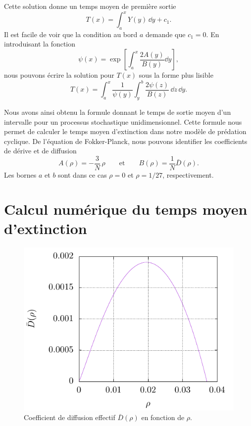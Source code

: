 \documentclass[openany,a4paper,12pt]{article}
\begin{document}
%
Cette solution donne un temps moyen de première sortie
%
\begin{equation}\label{echap_sol_T_avec_c1}
	T(x) = \int_a^x Y(y) \, \dd y + c_1.
\end{equation}
%
Il est facile de voir que la condition au bord $a$ demande que $c_1=0$. En introduisant la fonction   
%
\begin{equation}\label{echap_psi_x}
	\psi(x) = \exp\left[ \int_a^x \frac{2A(y)}{B(y)} \dd y \right] ,
\end{equation}
%
nous pouvons écrire la solution pour $T(x)$ sous la forme plus lisible
%
\begin{equation}\label{echap_sol_T_finale}
	T(x) = \int_a^x \frac{1}{\psi(y)} \int_y^b \frac{2\psi(z)}{B(z)} \, \dd z \, \dd y.
\end{equation}
%

\par Nous avons ainsi obtenu la formule donnant le temps de sortie moyen d'un intervalle pour un processus stochastique unidimensionnel. Cette formule nous permet de calculer le temps moyen d'extinction dans notre modèle de prédation cyclique. De l'équation de Fokker-Planck, nous pouvons identifier les coefficients de dérive et de diffusion
%
\begin{equation}\label{coefs_A_B_radial}
A(\rho) = - \frac 3N \, \rho \qquad \text{et} \qquad 
B(\rho) = \frac 1N \bar D(\rho).
\end{equation}
%
Les bornes $a$ et $b$ sont dans ce cas $\rho=0$ et $\rho=1/27$, respectivement.


\section{Calcul numérique du temps moyen d'extinction}
\label{section_textc_numerique}

\begin{figure}
	\centering
	\includegraphics[width=0.7\linewidth]{figures/D_rho}
	\caption{Coefficient de diffusion effectif $\bar D(\rho)$ en fonction de $\rho$.}
	\label{fig:D_rho}
\end{figure}
\end{document}
